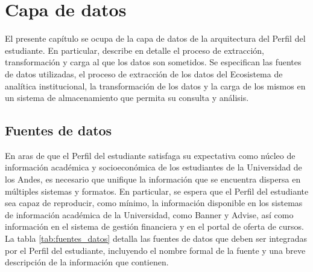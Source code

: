 \chapter{Capa de datos}
\label{ch:datos}

El presente capítulo se ocupa de la capa de datos de la arquitectura del Perfil del estudiante. En particular, describe en detalle el proceso de extracción, transformación y carga al que los datos son sometidos. Se especifican las fuentes de datos utilizadas, el proceso de extracción de los datos del Ecosistema de analítica institucional, la transformación de los datos y la carga de los mismos en un sistema de almacenamiento que permita su consulta y análisis.

\section{Fuentes de datos}

En aras de que el Perfil del estudiante satisfaga su expectativa como núcleo de información académica y socioeconómica de los estudiantes de la Universidad de los Andes, es necesario que unifique la información que se encuentra dispersa en múltiples sistemas y formatos. En particular, se espera que el Perfil del estudiante sea capaz de reproducir, como mínimo, la información disponible en los sistemas de información académica de la Universidad, como Banner y Advise, así como información en el sistema de gestión financiera y en el portal de oferta de cursos. La tabla \ref{tab:fuentes_datos} detalla las fuentes de datos que deben ser integradas por el Perfil del estudiante, incluyendo el nombre formal de la fuente y una breve descripción de la información que contienen.

